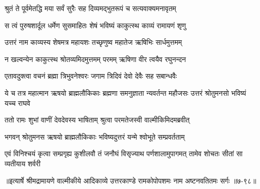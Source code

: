 \twolineshloka
{श्रुतं ते पूर्वमेतद्धि मया सर्वं सुरैः सह}
{दिव्यमद्भुतरूपं च सत्यवाक्यमनावृतम्} %

\twolineshloka
{स त्वं पुरुषशार्दूल धर्मेण सुसमाहितः}
{शेषं भविष्यं काकुत्स्थ काव्यं रामायणं शृणु} %

\twolineshloka
{उत्तरं नाम काव्यस्य शेषमत्र महायशः}
{तच्छृणुष्व महातेज ऋषिभिः सार्धमुत्तमम्} %

\twolineshloka
{न खल्वन्येन काकुत्स्थ श्रोतव्यमिदमुत्तमम्}
{परमम् ऋषिणा वीर त्वयैव रघुनन्दन} %

\twolineshloka
{एतावदुक्त्वा वचनं ब्रह्मा त्रिभुवनेश्वरः}
{जगाम त्रिदिवं देवो देवैः सह सबान्धवैः} %

\threelineshloka
{ये च तत्र महात्मान ऋषयो ब्राह्मलौकिकाः}
{ब्रह्मणा समनुज्ञाता न्यवर्तन्त महौजसः}
{उत्तरं श्रोतुमनसो भविष्यं यच्च राघवे} %

\twolineshloka
{ततो रामः शुभां वाणीं देवदेवस्य भाषिताम्}
{श्रुत्वा परमतेजस्वी वाल्मीकिमिदमब्रवीत्} %

\twolineshloka
{भगवन् श्रोतुमनस ऋषयो ब्राह्मलौकिकाः}
{भविष्यदुत्तरं यन्मे श्वोभूते सम्प्रवर्तताम्} %

\threelineshloka
{एवं विनिश्चयं कृत्वा सम्प्रगृह्य कुशीलवौ}
{तं जनौघं विसृज्याथ पर्णशालामुपागमत्}
{तामेव शोचतः सीतां सा व्यतीयाय शर्वरी} %


॥इत्यार्षे श्रीमद्रामायणे वाल्मीकीये आदिकाव्ये उत्तरकाण्डे रामकोपोपशमः नाम अष्टनवतितमः सर्गः ॥७-९८॥
